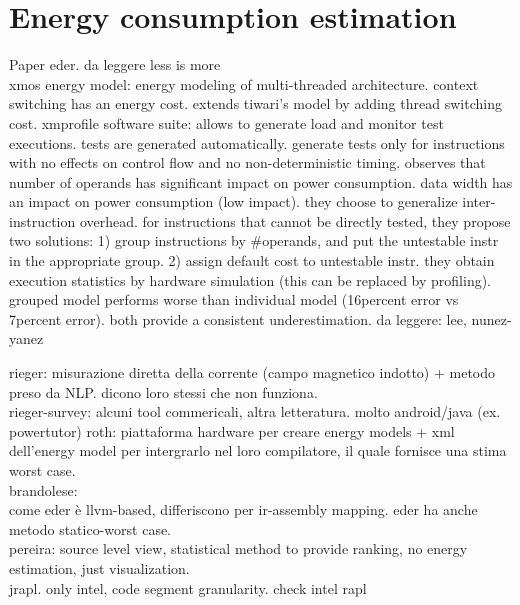 \section{Energy consumption estimation}
Paper eder. 
da leggere less is more\\
xmos energy model: energy modeling of multi-threaded architecture. context switching has an energy cost. extends tiwari's model by adding thread switching cost. xmprofile software suite: allows to generate load and monitor test executions. tests are generated automatically. generate tests only for instructions with no effects on control flow and no non-deterministic timing.
observes that number of operands has significant impact on power consumption. data width has an impact on power consumption (low impact). they choose to generalize inter-instruction overhead. 
for instructions that cannot be directly tested, they propose two solutions: 1) group instructions by #operands, and put the untestable instr in the appropriate group. 2) assign default cost to untestable instr. 
they obtain execution statistics by hardware simulation (this can be replaced by profiling).
grouped model performs worse than individual model (16percent error vs 7percent error). both provide a consistent underestimation.
da leggere: lee, nunez-yanez


rieger: misurazione diretta della corrente (campo magnetico indotto) + metodo preso da NLP. dicono loro stessi che non funziona. \\
rieger-survey: alcuni tool commericali, altra letteratura. molto android/java (ex. powertutor)
roth: piattaforma hardware per creare energy models + xml dell'energy model per intergrarlo nel loro compilatore, il quale fornisce una stima worst case. \\
brandolese: \\  come eder è llvm-based, differiscono per ir-assembly mapping. eder ha anche metodo statico-worst case. \\
pereira: source level view, statistical method to provide ranking, no energy estimation, just visualization. \\
jrapl. only intel, code segment granularity. check intel rapl 


